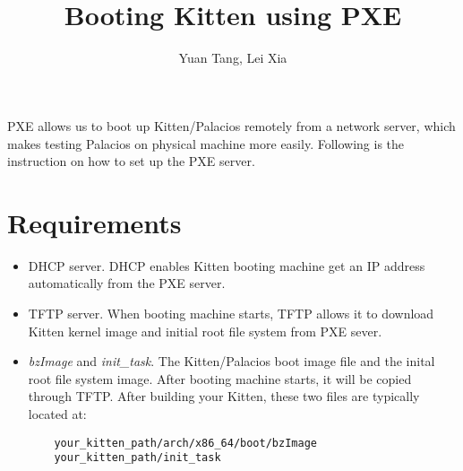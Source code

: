 \documentclass[11pt]{article}
\begin{document}
\title{\ \\ \LARGE\bf
Booting Kitten using PXE
}

\author{Yuan Tang, Lei Xia}

\maketitle

PXE allows us to boot up Kitten/Palacios remotely from a network server, which makes testing Palacios on physical machine more easily. Following is the instruction on how to set up the PXE server.

\section{Requirements}

\begin{itemize}
\item DHCP server. DHCP enables Kitten booting machine get an IP address automatically from the PXE server.
\item TFTP server. When booting machine starts, TFTP allows it to download Kitten kernel image and initial root file system from PXE sever.
\item {\em bzImage} and {\em init\_task}. The Kitten/Palacios boot image file and the inital root file system image. After booting machine starts, it will be copied through TFTP. After building your Kitten, these two files are typically located at:
\begin{verbatim}
    your_kitten_path/arch/x86_64/boot/bzImage
    your_kitten_path/init_task
\end{verbatim}
\end{itemize}
\end{document}

